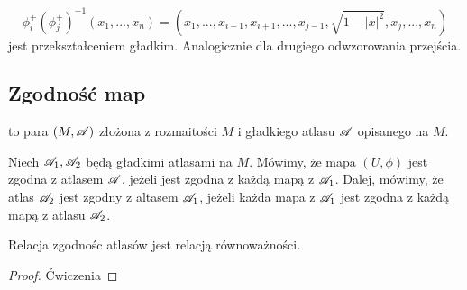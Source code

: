 \begin{center}\end{center}

$$\phi_i^+(\phi_j^+)^{-1}(x_1,...,x_n)=(x_1,...,x_{i-1}, x_{i+1},...,x_{j-1},\sqrt{1-|x|^2},x_j,...,x_n)$$
jest przekształceniem gładkim. Analogicznie dla drugiego odwzorowania przejścia.

\subsection{Zgodność map}

\begin{definition}
     to para $(M, \mathcal{A})$ złożona z rozmaitości $M$ i gładkiego atlasu $\mathcal{A}$ opisanego na $M$.
\end{definition}

\begin{definition}
    Niech $\mathcal{A}_1,\mathcal{A}_2$ będą gładkimi atlasami na $M$.
    Mówimy, że mapa $(U, \phi)$ jest zgodna z atlasem $\mathcal{A}$, jeżeli jest zgodna z każdą mapą z $\mathcal{A}_1$. Dalej, mówimy, że atlas $\mathcal{A}_2$ jest zgodny z altasem $\mathcal{A}_1$, jeżeli każda mapa z $\mathcal{A}_1$ jest zgodna z każdą mapą z atlasu $\mathcal{A}_2$.
\end{definition}

%
%

\begin{theorem}
    Relacja zgodnośc atlasów jest relacją równoważności.
\begin{proof}
Ćwiczenia
\end{proof}
\end{theorem}

